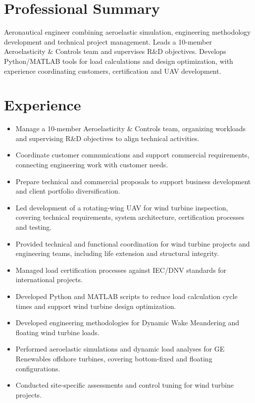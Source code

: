 

\small
\section{Professional Summary}
Aeronautical engineer combining aeroelastic simulation, engineering methodology development and technical project management. Leads a 10-member Aeroelasticity \& Controls team and supervises R\&D objectives. Develops Python/MATLAB tools for load calculations and design optimization, with experience coordinating customers, certification and UAV development.
\section{Experience}
\begin{itemize}
\item Manage a 10-member Aeroelasticity \& Controls team, organizing workloads and supervising R\&D objectives to align technical activities.
\item Coordinate customer communications and support commercial requirements, connecting engineering work with customer needs.
\item Prepare technical and commercial proposals to support business development and client portfolio diversification.
\end{itemize}
\begin{itemize}
\item Led development of a rotating-wing UAV for wind turbine inspection, covering technical requirements, system architecture, certification processes and testing.
\item Provided technical and functional coordination for wind turbine projects and engineering teams, including life extension and structural integrity.
\item Managed load certification processes against IEC/DNV standards for international projects.
\end{itemize}
\begin{itemize}
\item Developed Python and MATLAB scripts to reduce load calculation cycle times and support wind turbine design optimization.
\item Developed engineering methodologies for Dynamic Wake Meandering and floating wind turbine loads.
\item Performed aeroelastic simulations and dynamic load analyses for GE Renewables offshore turbines, covering bottom-fixed and floating configurations.
\item Conducted site-specific assessments and control tuning for wind turbine projects.
\end{itemize}
